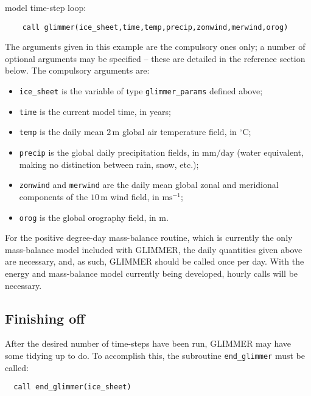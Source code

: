 \documentclass[11pt]{article}
\begin{document}
model time-step loop:
%
\begin{verbatim}
    call glimmer(ice_sheet,time,temp,precip,zonwind,merwind,orog)
\end{verbatim} 
%
The arguments given in this example are the compulsory ones only; a number of
optional arguments may be specified -- these are detailed in the reference
section below. The compulsory arguments are:
%
\begin{itemize}
\item \texttt{ice\_sheet} is the variable of type \texttt{glimmer\_params}
 defined above;
\item \texttt{time} is the current model time, in years;
\item \texttt{temp} is the daily mean $2\,\mathrm{m}$ global air temperature field, in
  $^{\circ}\mathrm{C}$;
\item \texttt{precip} is the global daily precipitation fields,
  in $\mathrm{mm}/\mathrm{day}$ (water equivalent, making no distinction
  between rain, snow, etc.);
\item \texttt{zonwind} and \texttt{merwind} are the daily mean global zonal and
  meridional components of the $10\,\mathrm{m}$ wind field, in
  $\mathrm{ms}^{-1}$;
\item \texttt{orog} is the global orography field, in $\mathrm{m}$.
\end{itemize}
%
For the positive degree-day mass-balance routine, which is currently the only
mass-balance model included with GLIMMER, the daily quantities given above are
necessary, and, as such, GLIMMER should be called once per day. With the
energy and mass-balance model currently being developed, hourly calls will be
necessary. 
%
\subsection{Finishing off}
%
After the desired number of time-steps have been run, GLIMMER may have some
tidying up to do. To accomplish this, the subroutine \texttt{end\_glimmer}
must be called:
%
\begin{verbatim}
  call end_glimmer(ice_sheet)
\end{verbatim}
%
\end{document}

